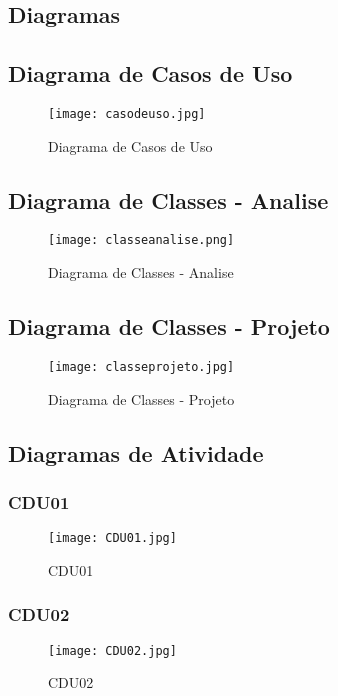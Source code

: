 \begin{landscape}
\section{Diagramas}\label{diagramas}

\subsection{Diagrama de Casos de Uso}
\begin{figure}[htb]
	\centering
	\texttt{[image: casodeuso.jpg]}
	\caption{Diagrama de Casos de Uso}
\end{figure}
\clearpage

\subsection{Diagrama de Classes - Analise}
\begin{figure}[htb]
	\centering
	\texttt{[image: classeanalise.png]}
	\caption{Diagrama de Classes - Analise}
\end{figure}
\clearpage

\subsection{Diagrama de Classes - Projeto}
\begin{figure}[htb]
	\centering
	\texttt{[image: classeprojeto.jpg]}
	\caption{Diagrama de Classes - Projeto}
\end{figure}
\clearpage

\subsection{Diagramas de Atividade}
\subsubsection{CDU01}
\begin{figure}[htb]
	\centering
	\texttt{[image: CDU01.jpg]}
	\caption{CDU01}
\end{figure}
\clearpage
%
\subsubsection{CDU02}
\begin{figure}[htb]
	\centering
	\texttt{[image: CDU02.jpg]}
	\caption{CDU02}
\end{figure}
\clearpage
%

\end{landscape}

